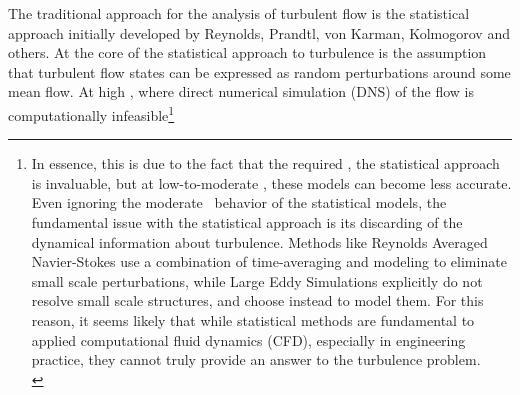 The traditional approach for the analysis of turbulent flow is the statistical approach initially developed by Reynolds, Prandtl, von Karman, Kolmogorov and others. At the core of the statistical approach to turbulence is the assumption that turbulent flow states can be expressed as random perturbations around some mean flow. At high \ReN, where direct numerical simulation (DNS) of the flow is computationally infeasible\footnote{In essence, this is due to the fact that the required , the statistical approach is invaluable, but at low-to-moderate \ReN, these models can become less accurate. Even ignoring the moderate \ReN\ behavior of the statistical models, the fundamental issue with the statistical approach is its discarding of the dynamical information about turbulence. Methods like Reynolds Averaged Navier-Stokes use a combination of time-averaging and modeling to eliminate small scale perturbations, while Large Eddy Simulations explicitly do not resolve small scale structures, and choose instead to model them. For this reason, it seems likely that while statistical methods are fundamental to applied computational fluid dynamics (CFD), especially in engineering practice, they cannot truly provide an answer to the turbulence problem. \\

}
